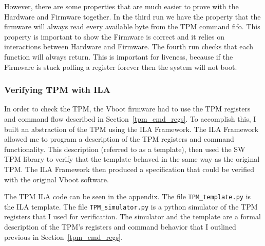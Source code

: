\documentclass[../report.tex]{subfiles}
\def\code#1{\texttt{#1}}
\begin{document}
However, there are some properties that are much easier to prove with the 
Hardware and Firmware together.
In the third run we have the property that the firmware will always read every available byte from the TPM command fifo.
This property is important to show the Firmware is correct and it relies on interactions between Hardware and Firmware.
The fourth run checks that each function will always return. 
This is important for liveness, because if the Firmware is stuck polling a register forever then the system will not boot.


\subsubsection{Verifying TPM with ILA}   

In order to check the TPM, the Vboot firmware had to use the TPM registers and
command flow  described in Section~\ref{tpm_cmd_regs}.
To accomplish this, I built an abstraction of the TPM using the ILA Framework.
The ILA Framework allowed me to program a description of the TPM registers and
command functionality.
This description (referred to as a template), then used the SW TPM library to
verify that the template behaved in the same way as the original TPM. 
The ILA Framework then produced a specification that could be verified with the
original Vboot software.

The TPM ILA code can be seen in the appendix.
The file \code{TPM\_template.py} is the ILA template.
The file \code{TPM\_simulator.py} is a python simulator of the TPM registers that
I used for verification.
The simulator and the template are a formal description of the TPM's registers and command behavior that I outlined previous in Section~\ref{tpm_cmd_regs}. 

\clearpage
\end{document}

